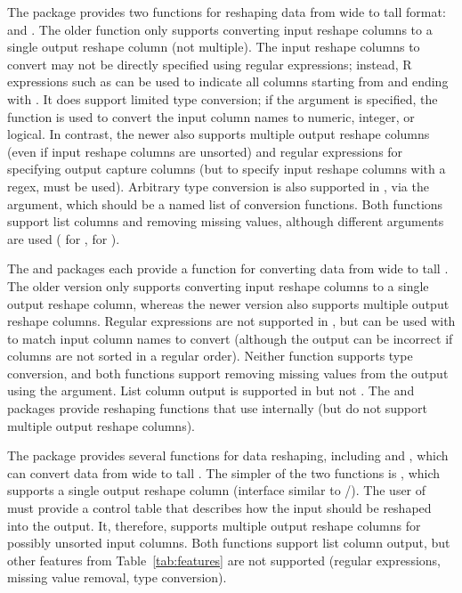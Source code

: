 The  package provides two functions for reshaping data from
wide to tall format:  and . The older
 function only supports converting input reshape columns to a
single output reshape column (not multiple).
The input reshape columns to convert may
not be directly specified using regular expressions; instead, R
expressions such as  can be used to indicate all columns
starting from  and ending with . It does support
limited type conversion; if the  argument is
specified, the  function is used to convert
the input column names to numeric, integer, or logical. In contrast,
the newer  also supports multiple output reshape columns
(even if input reshape columns are unsorted) and regular expressions for
specifying output capture columns
(but to specify input reshape columns with a regex,
 must be used). Arbitrary type conversion is also supported in
, via the  argument, which
should be a named list of conversion functions.
Both functions support list columns and
removing missing values, although different arguments are used
( for ,  for
).

The  and  packages each provide a
 function for converting data from wide to tall
\citep{Wickham2007, Dowle2019}. The older  version only
supports converting input reshape columns to a single output reshape
column, whereas the newer  version also supports
multiple output reshape columns. Regular expressions are not supported
in , but can be used with  to
match input column names to convert (although the output can be
incorrect if columns are not sorted in a regular order). Neither
function supports type conversion, and both functions support removing
missing values from the output using the  argument. List
column output is supported in  but not .
The  \citep{Barrett2020} and 
\citep{HuangZhao2020} packages provide reshaping functions that use
 internally (but do not support multiple output
reshape columns).

The  package provides several functions for data
reshaping, including  and
, which can convert data from wide to tall
\citep{Mount2019}. The simpler of the two functions is
, which supports a single output reshape column
(interface similar to /). The
user of  must provide a control table that
describes how the input should be reshaped into the output. It,
therefore, supports multiple output reshape columns for possibly unsorted
input columns. Both functions support list column output, but other
features from Table~\ref{tab:features} are not supported (regular
expressions, missing value removal, type conversion).

